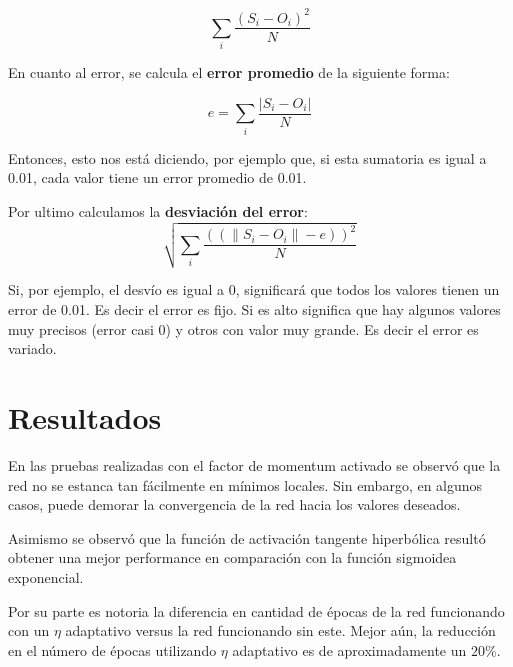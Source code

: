 \documentclass[%
    final,
    reprint,
    notitlepage,
    narroweqnarray,
    inline,
    twoside,
    invited
    ]{ieee}
\begin{document}
\begin{equation}
\sum\limits_{i}\frac{(S_i - O_i)^{2}}{N}
\end{equation}

\par En cuanto al error, se calcula el \textbf{error promedio} de la siguiente forma:

\begin{equation}
e = \sum\limits_{i}\frac{|S_i - O_i|}{N}
\end{equation}


Entonces, esto nos está diciendo, por ejemplo que, si esta sumatoria es igual a 0.01, cada valor tiene un error promedio de 0.01.

\par Por ultimo calculamos la \textbf{desviación del error}:\\

\begin{equation}
\sqrt{\sum\limits_{i}\frac{((\|S_i - O_i\| - e))^2}{N}}
\end{equation}

Si, por ejemplo, el desvío es igual a 0, significará que todos los valores tienen un error de
0.01. Es decir el error es fijo. Si es alto significa que hay algunos valores muy precisos (error casi 0) y otros con valor muy grande. Es decir el error es variado.

\section{Resultados}

\par En las pruebas realizadas con el factor de momentum activado se observó que la red no se estanca tan fácilmente en mínimos locales. Sin embargo, en algunos casos, puede demorar la convergencia de la red hacia los valores deseados.\\

\par Asimismo se observó que la función de activación tangente hiperbólica resultó obtener una mejor performance en comparación con la función sigmoidea exponencial.

\par Por su parte es notoria la diferencia en cantidad de épocas de la red funcionando con un $\eta$ adaptativo versus la red funcionando sin este. Mejor aún, la reducción en el número de épocas utilizando $\eta$ adaptativo es de aproximadamente un $20\%$.\\
\end{document}
